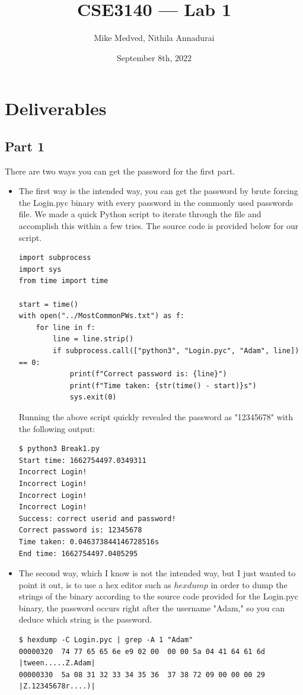 \documentclass{article}
\title{CSE3140 — Lab 1}
\author{Mike Medved, Nithila Annadurai}
\date{September 8th, 2022}
\begin{document}
\maketitle

\section{Deliverables}

\subsection{Part 1}

There are two ways you can get the password for the first part.

\begin{itemize}
    \item The first way is the intended way, you can get the password by brute forcing the Login.pyc binary with every password in the commonly used passwords file. We made a quick Python script to iterate through the file and accomplish this within a few tries. The source code is provided below for our script.
    
\begin{verbatim}
import subprocess
import sys
from time import time

start = time()
with open("../MostCommonPWs.txt") as f:
    for line in f:
        line = line.strip()
        if subprocess.call(["python3", "Login.pyc", "Adam", line]) == 0:
            print(f"Correct password is: {line}")
            print(f"Time taken: {str(time() - start)}s")
            sys.exit(0)
    \end{verbatim}

    Running the above script quickly revealed the password as "12345678" with the following output:
    \begin{verbatim}
$ python3 Break1.py 
Start time: 1662754497.0349311
Incorrect Login!
Incorrect Login!
Incorrect Login!
Incorrect Login!
Success: correct userid and password!
Correct password is: 12345678
Time taken: 0.046373844146728516s
End time: 1662754497.0405295
\end{verbatim}

    \item The second way, which I know is not the intended way, but I just wanted to point it out, is to use a hex editor such as $hexdump$ in order to dump the strings of the binary according to the source code provided for the Login.pyc binary, the password occurs right after the username "Adam," so you can deduce which string is the password.
    
    \begin{verbatim}
$ hexdump -C Login.pyc | grep -A 1 "Adam"
00000320  74 77 65 65 6e e9 02 00  00 00 5a 04 41 64 61 6d  |tween.....Z.Adam|
00000330  5a 08 31 32 33 34 35 36  37 38 72 09 00 00 00 29  |Z.12345678r....)|
    \end{verbatim}
\end{itemize}
\end{document}
